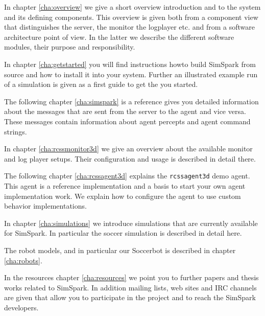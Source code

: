 In chapter \ref{cha:overview} we give a short overview introduction
and to the system and its defining components. This overview is given
both from a component view that distinguishes the server, the monitor
the logplayer etc. and from a software architecture point of view. In
the latter we describe the different software modules, their purpose
and responsibility.

In chapter \ref{cha:getstarted} you will find instructions howto build
SimSpark from source and how to install it into your system. Further
an illustrated example run of a simulation is given as a first guide
to get the you started.

The following chapter \ref{cha:simspark} is a reference gives you
detailed information about the messages that are sent from the server
to the agent and vice versa. These messages contain information about
agent percepts and agent command strings.

In chapter \ref{cha:rcssmonitor3d} we give an overview about the
available monitor and log player setups. Their configuration and usage
is described in detail there.

The following chapter \ref{cha:rcssagent3d} explains the
\texttt{rcssagent3d} demo agent. This agent is a reference implementation and 
a basis to start your own agent implementation work. We explain how
to configure the agent to use custom behavior implementations.

In chapter \ref{cha:simulations} we introduce simulations that are
currently available for SimSpark. In particular the soccer simulation
is described in detail here.

The robot models, and in particular our Soccerbot is described in
chapter \ref{cha:robots}.

In the resources chapter \ref{cha:resources} we point you to further
papers and thesis works related to SimSpark. In addition mailing
lists, web sites and IRC channels are given that allow you to
participate in the project and to reach the SimSpark developers.


